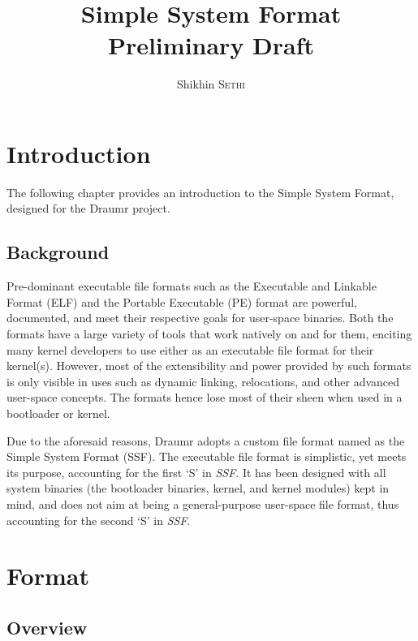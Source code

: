 \documentclass[a4paper,oneside]{memoir}
\begin{document}
\title{Simple System Format\\\small Preliminary Draft}
\author{Shikhin \textsc{Sethi}}
\maketitle

\clearpage

\tableofcontents
\listoftables

\chapter{Introduction}

The following chapter provides an introduction to the Simple System Format, designed for the Draumr project.

\section{Background}

Pre-dominant executable file formats such as the Executable and Linkable Format (ELF) and the Portable Executable (PE) format are powerful, documented, and meet their respective goals for user-space binaries. Both the formats have a large variety of tools that work natively on and for them, enciting many kernel developers to use either as an executable file format for their kernel(s). However, most of the extensibility and power provided by such formats is only visible in uses such as dynamic linking, relocations, and other advanced user-space concepts. The formats hence lose most of their sheen when used in a bootloader or kernel.

Due to the aforesaid reasons, Draumr adopts a custom file format named as the Simple System Format (SSF). The executable file format is simplistic, yet meets its purpose, accounting for the first `S' in \emph{SSF}. It has been designed with all system binaries (the bootloader binaries, kernel, and kernel modules) kept in mind, and does not aim at being a general-purpose user-space file format, thus accounting for the second `S' in \emph{SSF}.

\chapter{Format}

\section{Overview}
\end{document}
